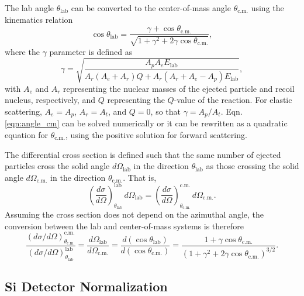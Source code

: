 The lab angle $\theta_{\mathrm{lab}}$ can be converted to the center-of-mass angle $\theta_{\mathrm{c.m.}}$ using the kinematics relation \cite{Iliadis2015}
\begin{equation} \label{eqn:angle_cm}
\cos \theta_{\mathrm{lab}} = \frac{\gamma + \cos \theta_{\mathrm{c.m.}}}{\sqrt{1 + \gamma^{2} + 2\gamma\cos \theta_{\mathrm{c.m.}}}},
\end{equation}
where the $\gamma$ parameter is defined as
\begin{equation}
\gamma = \sqrt{\frac{A_{p}A_{e}E_{\mathrm{lab}}}{A_{r}(A_{e} + A_{r})Q + A_{r}(A_{r} + A_{e} - A_{p})E_{\mathrm{lab}}}},
\end{equation}
with $A_{e}$ and $A_{r}$ representing the nuclear masses of the ejected particle and recoil nucleus, respectively, and $Q$ representing the $Q$-value of the reaction. For elastic scattering, $A_{e} = A_{p}$, $A_{r} = A_{t}$, and $Q=0$, so that $\gamma = A_{p}/A_{t}$. Eqn. \ref{eqn:angle_cm} can be solved numerically or it can be rewritten as a quadratic equation for $\theta_{\mathrm{c.m.}}$, using the positive solution for forward scattering.

The differential cross section is defined such that the same number of ejected particles cross the solid angle $d\Omega_{\mathrm{lab}}$ in the direction $\theta_{\mathrm{lab}}$ as those crossing the solid angle $d\Omega_{\mathrm{c.m.}}$ in the direction $\theta_{\mathrm{c.m.}}$. That is,
\begin{equation}
\left( \frac{d\sigma}{d\Omega} \right)^{\mathrm{lab}}_{\theta_{\mathrm{lab}}} \, d\Omega_{\mathrm{lab}} = \left( \frac{d\sigma}{d\Omega} \right)^{\mathrm{c.m.}}_{\theta_{\mathrm{c.m.}}} \, d\Omega_{\mathrm{c.m.}}.
\end{equation}
Assuming the cross section does not depend on the azimuthal angle, the conversion between the lab and center-of-mass systems is therefore
\begin{equation}
\frac{\left( d\sigma/d\Omega \right)^{\mathrm{c.m.}}_{\theta_{\mathrm{c.m.}}}}{\left( d\sigma/d\Omega \right)^{\mathrm{lab}}_{\theta_{\mathrm{lab}}}} = \frac{d\Omega_{\mathrm{lab}}}{d\Omega_{\mathrm{c.m.}}} = \frac{d(\cos \theta_{\mathrm{lab}})}{d(\cos \theta_{\mathrm{c.m.}})} = \frac{1 + \gamma \cos \theta_{\mathrm{c.m.}}}{\left( 1 + \gamma^{2} + 2 \gamma \cos \theta_{\mathrm{c.m.}} \right)^{3/2}}.
\end{equation}

\subsection{Si Detector Normalization} \label{subsec:SiNorm}

